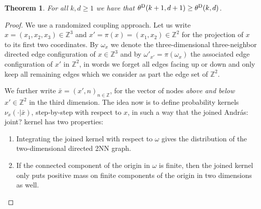 \documentclass{article}
\newtheorem{theorem}{Theorem}[section]
\theoremstyle{definition}
\newcommand{\1}{\mathbbm{1}}
\newcommand{\0}{\mathbf{o}}
\newcommand{\Z}{\mathbb{Z}}
\begin{document}
\begin{theorem}\label{theorem-3322}
For all $k,d\ge1$ we have that $\theta^{\rm D}(k+1,d+1)\ge \theta^{\rm D}(k,d)$.
\end{theorem}
\begin{proof}
We use a randomized coupling approach. Let us write $x=(x_1,x_2,x_3)\in \Z^3$ and $x'=\pi(x)=(x_1,x_2)\in \Z^2$ for the projection of $x$ to its first two coordinates. By $\omega_{x}$ we denote the three-dimensional three-neighbor directed edge configuration of $x\in \Z^3$ and by $\omega'_{x'}=\pi(\omega_{x})$ the associated edge configuration of $x'$ in $\Z^2$, in words we forget all edges facing up or down and only keep all remaining edges which we consider as part the edge set of $\Z^2$. 

We further write $\bar x=(x',n)_{n\in\Z}$, for the vector of nodes {\em above and below} $x'\in \Z^2$ in the third dimension. The idea now is to define probability kernels $\nu_x(\cdot|\bar x)$, step-by-step with respect to $x$, in such a way that the joined \color{red} András: joint? \color{black} kernel has two properties:
\begin{enumerate}
\item Integrating the joined kernel with respect to $\omega$ gives the distribution of the two-dimensional directed 2NN graph. 
\item If the connected component of the origin in $\omega$ is finite, then the joined kernel only puts positive mass on finite components of the origin in two dimensions as well. 
\end{enumerate}


\end{proof}
\end{document}
